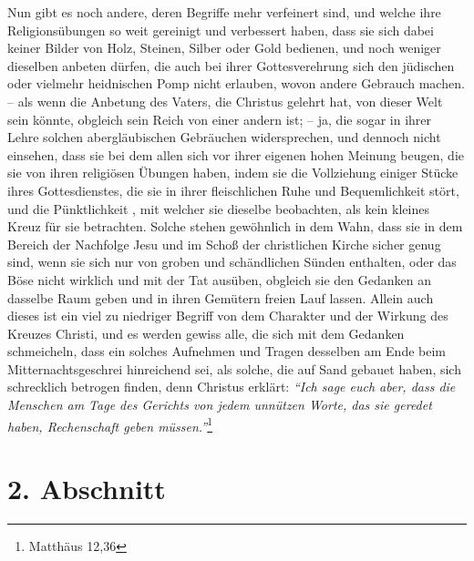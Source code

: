 Nun gibt es noch andere, deren Begriffe mehr
verfeinert sind, und welche ihre
Religionsübungen so weit
gereinigt und verbessert haben, dass sie sich dabei keiner Bilder von Holz,
Steinen, Silber oder Gold bedienen,
und noch weniger dieselben anbeten dürfen, die auch bei ihrer Gottesverehrung
sich den jüdischen  oder vielmehr heidnischen Pomp nicht
erlauben, wovon andere
Gebrauch
machen.  -- als wenn die Anbetung des Vaters, die Christus
gelehrt hat, von
dieser Welt sein könnte, obgleich sein Reich von einer andern ist; -- ja, die
sogar in ihrer Lehre solchen abergläubischen Gebräuchen widersprechen, und
dennoch nicht einsehen, dass sie bei dem allen sich vor ihrer eigenen hohen
Meinung beugen, die sie von ihren religiösen Übungen haben, indem sie die
Vollziehung einiger Stücke ihres Gottesdienstes, die sie in ihrer fleischlichen
Ruhe und Bequemlichkeit stört, und die Pünktlichkeit , mit
welcher sie dieselbe
beobachten, als
kein kleines Kreuz für sie betrachten. Solche stehen
gewöhnlich in dem Wahn,
dass sie in dem Bereich der Nachfolge Jesu und im Schoß der christlichen
Kirche sicher genug sind, wenn sie sich nur von groben und schändlichen Sünden
enthalten,   oder das Böse
nicht wirklich und mit der Tat ausüben, obgleich sie
den Gedanken an dasselbe Raum geben und in ihren Gemütern freien Lauf lassen.
Allein auch dieses ist ein viel zu niedriger Begriff von dem Charakter und der
Wirkung des Kreuzes Christi, und es werden gewiss alle, die sich mit dem
Gedanken schmeicheln, dass ein solches Aufnehmen und Tragen desselben am Ende
beim Mitternachtsgeschrei
hinreichend sei,   als
solche, die auf Sand
gebauet haben, sich schrecklich betrogen finden, denn Christus erklärt:
\textit{"`Ich sage euch aber, dass die Menschen am Tage des Gerichts von jedem
unnützen Worte, das sie geredet haben, Rechenschaft geben
müssen."'}\footnote{Matthäus 12,36}

\section{2. Abschnitt} \label{kap6_ab2}

